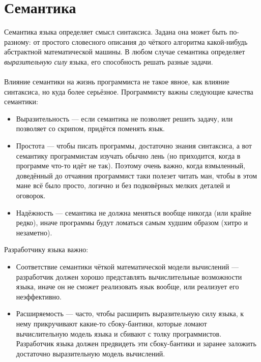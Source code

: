\documentclass[11pt]{book}
\begin{document}
\section{Семантика}
Семантика языка определяет смысл синтаксиса.
Задана она может быть по-разному: от простого словесного описания до чёткого алгоритма какой-нибудь абстрактной математической машины.
В любом случае семантика определяет \emph{выразительную силу} языка, его способность решать разные задачи.
\\ \\
Влияние семантики на жизнь программиста не такое явное, как влияние синтаксиса, но куда более серьёзное.
Программисту важны следующие качества семантики:
\begin{itemize}
\item Выразительность --- если семантика не позволяет решить задачу, или позволяет со скрипом, придётся поменять язык.
\item Простота --- чтобы писать программы, достаточно знания синтаксиса,
а вот семантику программистам изучать обычно лень (но приходится, когда в программе что-то идёт не так).
Поэтому очень важно, когда взмыленный, доведённый до отчаяния программист таки полезет читать ман,
чтобы в этом мане всё было просто, логично и без подковёрных мелких деталей и оговорок.
\item Надёжность --- семантика не должна меняться вообще никогда (или крайне редко),
иначе программы будут ломаться самым худшим образом (хитро и незаметно).
\end{itemize}
Разработчику языка важно:
\begin{itemize}
\item Соответствие семантики чёткой математической модели вычислений --- разработчик должен хорошо представлять вычислительные возможности языка,
иначе он не сможет реализовать язык вообще, или реализует его неэффективно.
\item Расширяемость --- часто, чтобы расширить выразительную силу языка, к нему прикручивают какие-то сбоку-бантики,
которые ломают вычислительную модель языка и сбивают с толку программистов.
Разработчик языка должен предвидеть эти сбоку-бантики и заранее заложить достаточно выразительную модель вычислений.
\end{itemize}
\end{document}
